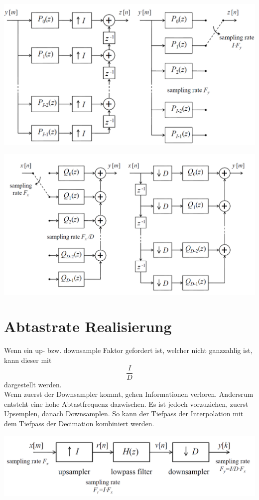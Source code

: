 \begin{minipage}{.48\textwidth}
	\centering
	\includegraphics[width=\textwidth]{./images/polyphase_up}
\end{minipage}
\begin{minipage}{.48\textwidth}
	\centering
	\includegraphics[width=\textwidth]{./images/polyphase_down}
\end{minipage}

\section{Abtastrate Realisierung}
Wenn ein up- bzw. downsample Faktor gefordert ist, welcher nicht ganzzahlig ist,
kann dieser mit
\[ \frac{I}{D} \]
dargestellt werden.\\
Wenn zuerst der Downsampler kommt, gehen Informationen verloren. Andersrum
entsteht eine hohe Abtastfrequenz dazwischen. Es ist jedoch vorzuziehen,
zuerst Upsemplen, danach Downsamplen. So kann der Tiefpass der Interpolation
mit dem Tiefpass der Decimation kombiniert werden.
\begin{center}
	\includegraphics[scale=.7]{./images/sampling}
\end{center}

